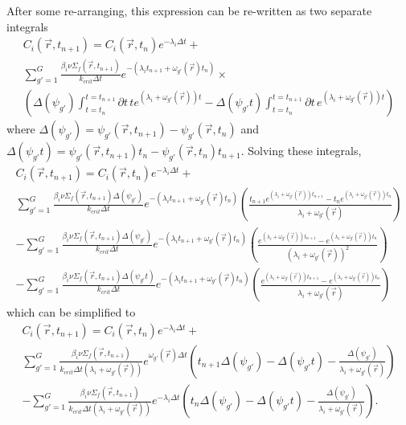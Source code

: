 \documentclass[12pt]{report}
\begin{document}
	After some re-arranging, this expression can be re-written as two separate integrals
	\begin{eqnarray}
	C_i(\vec{r},t_{n+1}) =  C_i(\vec{r},t_{n}) e^{-\lambda_i \Delta t} + \nonumber \\  \sum_{g'=1}^{G} \frac{\beta_i \nu\Sigma_f(\vec{r},t_{n+1})}{k_{crit} \Delta t} e^{-\left(\lambda_i t_{n+1} + \omega_{g'}(\vec{r}) t_n \right)} 
	\times \nonumber \\ 
	\left(  \Delta(\psi_{g'}) \int_{t=t_n}^{t=t_{n+1}}  \partial t \, t e^{\left(\lambda_i + \omega_{g'}(\vec{r}) \right)  t} - \Delta(\psi_{g'} t) \int_{t=t_n}^{t=t_{n+1}}  \partial t \, e^{\left(\lambda_i + \omega_{g'}(\vec{r}) \right)  t} \right) \nonumber
	\end{eqnarray}
	where $\Delta(\psi_{g'}) =   \psi_{g'}(\vec{r},t_{n+1}) - \psi_{g'}(\vec{r},t_n)$ and $\Delta(\psi_{g'}t) =   \psi_{g'}(\vec{r},t_{n+1}) t_n - \psi_{g'}(\vec{r},t_n) t_{n+1}$. Solving these integrals,	
	\begin{eqnarray}
	C_i(\vec{r},t_{n+1}) =  C_i(\vec{r},t_{n}) e^{-\lambda_i \Delta t} + \nonumber \\  \sum_{g'=1}^{G} \frac{\beta_i \nu\Sigma_f(\vec{r},t_{n+1}) \Delta(\psi_{g'})}{k_{crit} \Delta t} e^{-\left(\lambda_i t_{n+1} + \omega_{g'}(\vec{r}) t_n \right)}  \left( \frac{t_{n+1} e^{\left(\lambda_i + \omega_{g'}(\vec{r}) \right)  t_{n+1}} - t_n e^{\left(\lambda_i + \omega_{g'}(\vec{r}) \right)  t_{n}}}{\lambda_i + \omega_{g'}(\vec{r})} \right) \nonumber \\
	- \sum_{g'=1}^{G} \frac{\beta_i\nu\Sigma_f(\vec{r},t_{n+1}) \Delta(\psi_{g'})}{k_{crit} \Delta t} e^{-\left(\lambda_i t_{n+1} + \omega_{g'}(\vec{r}) t_n \right)} \left( \frac{e^{\left(\lambda_i + \omega_{g'}(\vec{r}) \right)  t_{n+1}} - e^{\left(\lambda_i + \omega_{g'}(\vec{r}) \right)  t_{n}}}{\left(\lambda_i + \omega_{g'}(\vec{r})\right)^2}\right)
	 \nonumber \\ 
	 - \sum_{g'=1}^{G} \frac{\beta_i\nu\Sigma_f(\vec{r},t_{n+1}) \Delta(\psi_{g'}t)}{k_{crit} \Delta t} e^{-\left(\lambda_i t_{n+1} + \omega_{g'}(\vec{r}) t_n \right)} \left(\frac{e^{\left(\lambda_i + \omega_{g'}(\vec{r}) \right)  t_{n+1}} - e^{\left(\lambda_i + \omega_{g'}(\vec{r}) \right)  t_{n}}}{\lambda_i + \omega_{g'}(\vec{r})}\right) \nonumber
	\end{eqnarray}
	which can be simplified to
	\begin{eqnarray}
	C_i(\vec{r},t_{n+1}) =  C_i(\vec{r},t_{n}) e^{-\lambda_i \Delta t} + \nonumber \\  \sum_{g'=1}^{G} \frac{\beta_i \nu\Sigma_f(\vec{r},t_{n+1})}{k_{crit} \Delta t \left(\lambda_i + \omega_{g'}(\vec{r})\right)} e^{ \omega_{g'}(\vec{r}) \Delta t} \left( t_{n+1} \Delta(\psi_{g'}) - \Delta(\psi_{g'}t) - \frac{\Delta(\psi_{g'})}{\lambda_i + \omega_{g'}(\vec{r})} \right) \nonumber \\ 
	- \sum_{g'=1}^{G} \frac{\beta_i \nu\Sigma_f(\vec{r},t_{n+1})}{k_{crit} \Delta t \left(\lambda_i + \omega_{g'}(\vec{r})\right)} e^{-\lambda_i \Delta t} \left( t_{n} \Delta(\psi_{g'}) - \Delta(\psi_{g'}t) - \frac{\Delta(\psi_{g'})}{\lambda_i + \omega_{g'}(\vec{r})} \right). \nonumber
	\end{eqnarray}	
\end{document}

